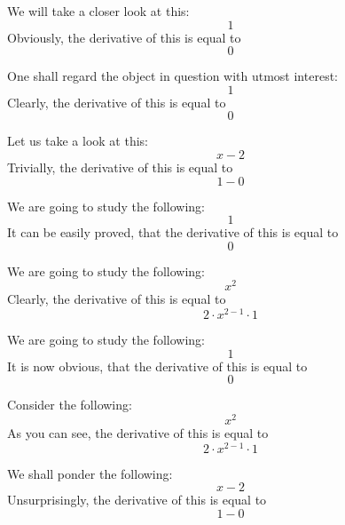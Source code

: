 \documentclass{article}
\begin{document}
We will take a closer look at this:
\begin{equation}
1 
\end{equation}
Obviously, the derivative of this is equal to
\begin{equation}
0 
\end{equation}

One shall regard the object in question with utmost interest:
\begin{equation}
1 
\end{equation}
Clearly, the derivative of this is equal to
\begin{equation}
0 
\end{equation}

Let us take a look at this:
\begin{equation}
x - 2 
\end{equation}
Trivially, the derivative of this is equal to
\begin{equation}
1 - 0 
\end{equation}

We are going to study the following:
\begin{equation}
1 
\end{equation}
It can be easily proved, that the derivative of this is equal to
\begin{equation}
0 
\end{equation}

We are going to study the following:
\begin{equation}
x ^{2 } 
\end{equation}
Clearly, the derivative of this is equal to
\begin{equation}
2 \cdot x ^{2 - 1 } \cdot 1 
\end{equation}

We are going to study the following:
\begin{equation}
1 
\end{equation}
It is now obvious, that the derivative of this is equal to
\begin{equation}
0 
\end{equation}

Consider the following:
\begin{equation}
x ^{2 } 
\end{equation}
As you can see, the derivative of this is equal to
\begin{equation}
2 \cdot x ^{2 - 1 } \cdot 1 
\end{equation}

We shall ponder the following:
\begin{equation}
x - 2 
\end{equation}
Unsurprisingly, the derivative of this is equal to
\begin{equation}
1 - 0 
\end{equation}
\end{document}
